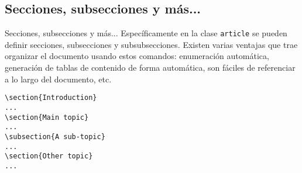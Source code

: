 \subsection{Secciones, subsecciones y más...}
\begin{frame}[fragile]{Secciones, subsecciones y más...}
Específicamente en la clase \texttt{article} se pueden definir secciones,
subsecciones y subsubsecciones. Existen varias ventajas que trae organizar el
documento usando estos comandos: enumeración automática, generación de tablas
de contenido de forma automática, son fáciles de referenciar a lo largo del
documento, etc.

\begin{lstlisting}[basicstyle=\tiny]
\section{Introduction}
...
\section{Main topic}
...
\subsection{A sub-topic}
...
\section{Other topic}
...
\end{lstlisting}

\end{frame}
